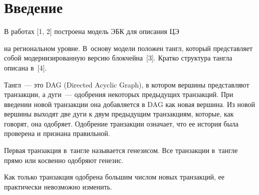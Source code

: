   




        


        




        


        


              \thispagestyle{headings}


              


              \vspace*{-12pt} 





  


   





\section{Введение}


 


  В работах [1, 2] построена модель ЭБК для описания ЦЭ


   на региональном уровне. В~основу модели положен тангл, который представляет собой модернизированную версию блокчейна~[3]. Кратко структура тангла описана в~[4]. 


  


  Тангл~--- это DAG (Directed Acyclic Graph), в котором вершины представляют транзакции, а дуги~--- одобрения некоторых предыдущих транзакций. При введении новой транзакции она добавляется в DAG как новая вершина. Из новой вершины выходят две дуги к двум предыдущим транзакциям, которые, как говорят, она одобряет. Одобрение транзакции означает, что ее история была проверена и признана правильной. 


  


  Первая транзакция в~тангле называется генезисом. Все транзакции в~тангле прямо или косвенно одобряют генезис.


  


  Как только транзакция одобрена большим числом новых транзакций, ее практически невозможно изменить. 


